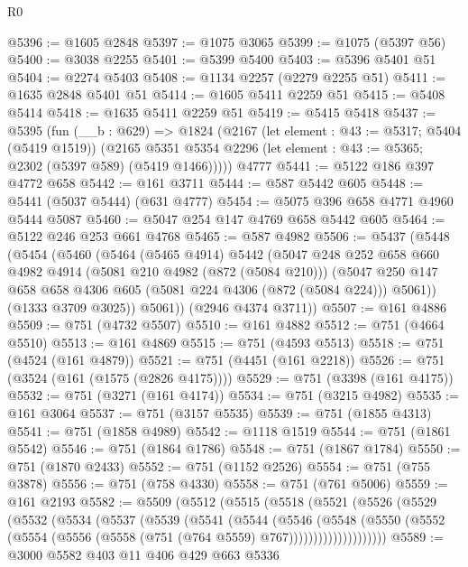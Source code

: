 \begin{lexlean}{R0}
\begin{coremodule}
@5396 := @1605 @2848
@5397 := @1075 @3065
@5399 := @1075 (@5397 @56)
@5400 := @3038 @2255
@5401 := @5399 @5400
@5403 := @5396 @5401 @51
@5404 := @2274 @5403
@5408 := @1134 @2257 (@2279 @2255 @51)
@5411 := @1635 @2848 @5401 @51
@5414 := @1605 @5411 @2259 @51
@5415 := @5408 @5414
@5418 := @1635 @5411 @2259 @51
@5419 := @5415 @5418
@5437 := @5395
    (fun (__b : @629) =>
    @1824
      (@2167
        (let element : @43 := @5317; @5404 (@5419 @1519))
        (@2165 @5351 @5354 @2296 (let element : @43 := @5365; @2302 (@5397 @589) (@5419 @1466)))))
    @4777
@5441 := @5122 @186 @397 @4772 @658
@5442 := @161 @3711
@5444 := @587 @5442 @605
@5448 := @5441 (@5037 @5444) (@631 @4777)
@5454 := @5075 @396 @658 @4771 @4960 @5444 @5087
@5460 := @5047 @254 @147 @4769 @658 @5442 @605
@5464 := @5122 @246 @253 @661 @4768
@5465 := @587 @4982
@5506 := @5437
    (@5448
      (@5454
        (@5460
          (@5464
            (@5465 @4914)
            @5442
            (@5047
              @248
              @252
              @658
              @660
              @4982
              @4914
              (@5081 @210 @4982 (@872 (@5084 @210)))
              (@5047 @250 @147 @658 @658 @4306 @605 (@5081 @224 @4306 (@872 (@5084 @224))) @5061))
            (@1333 @3709 @3025))
          @5061))
      (@2946 @4374 @3711))
@5507 := @161 @4886
@5509 := @751 (@4732 @5507)
@5510 := @161 @4882
@5512 := @751 (@4664 @5510)
@5513 := @161 @4869
@5515 := @751 (@4593 @5513)
@5518 := @751 (@4524 (@161 @4879))
@5521 := @751 (@4451 (@161 @2218))
@5526 := @751 (@3524 (@161 (@1575 (@2826 @4175))))
@5529 := @751 (@3398 (@161 @4175))
@5532 := @751 (@3271 (@161 @4174))
@5534 := @751 (@3215 @4982)
@5535 := @161 @3064
@5537 := @751 (@3157 @5535)
@5539 := @751 (@1855 @4313)
@5541 := @751 (@1858 @4989)
@5542 := @1118 @1519
@5544 := @751 (@1861 @5542)
@5546 := @751 (@1864 @1786)
@5548 := @751 (@1867 @1784)
@5550 := @751 (@1870 @2433)
@5552 := @751 (@1152 @2526)
@5554 := @751 (@755 @3878)
@5556 := @751 (@758 @4330)
@5558 := @751 (@761 @5006)
@5559 := @161 @2193
@5582 := @5509
    (@5512
      (@5515
        (@5518
          (@5521
            (@5526
              (@5529
                (@5532
                  (@5534
                    (@5537
                      (@5539
                        (@5541
                          (@5544
                            (@5546
                              (@5548
                                (@5550
                                  (@5552
                                    (@5554 (@5556 (@5558 (@751 (@764 @5559) @767))))))))))))))))))))
@5589 := @3000 @5582 @403 @11 @406 @429 @663 @5336

\end{coremodule}
\end{lexlean}
